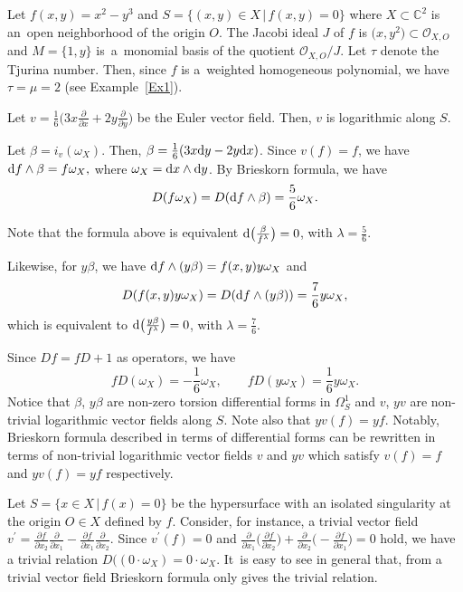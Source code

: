 \documentclass[pdftex]{sigma}%
\numberwithin{equation}{section}
\begin{document}
\begin{Example}
 Let $f(x,y)=x^2-y^3 $ and $ S=\{ (x,y) \in X \,|\, f(x,y)=0 \}$ where $X \subset {\mathbb C}^2$ is an~open neighborhood of the origin $O$. The Jacobi ideal $J$ of $f$ is $\big(x, y^2\big) \subset {\mathcal O}_{X,O}$ and $M=\{1, y\}$ is~a~monomial basis of the quotient
${\mathcal O}_{X,O}/J$. Let $\tau$ denote the Tjurina number. Then, since $f$ is a~weighted homogeneous polynomial, we have $\tau=\mu=2$ (see Example~\ref{Ex1}).

Let $v=\frac{1}{6}\big(3x\frac{\partial}{\partial x}+2y\frac{\partial}{\partial y}\big) $ be the Euler vector field. Then, $v$ is logarithmic along $ S$.

Let $\beta=i_v(\omega_X)$. Then, $ \beta=\frac{1}{6}(3x{\rm d}y-2y{\rm d}x)$.
Since $v(f)=f$, we have $ {\rm d}f\wedge \beta = f\omega_X, $ where $ \omega_X={\rm d}x \wedge {\rm d}y$.
By Brieskorn formula, we have
\begin{gather*}
D(f\omega_X) = D({\rm d}f\wedge \beta) =\dfrac{5}{6}\omega_X.
\end{gather*}

Note that the formula above is equivalent $ {\rm d} \big(\frac{\beta}{f^{\lambda}}\big) =0$, with $\lambda = \frac{5}{6}$.


Likewise, for $ y\beta$, we have $ {\rm d}f\wedge (y\beta) = f(x,y)y\omega_X $ and
\begin{gather*}
D(f(x,y)y\omega_X) = D({\rm d}f\wedge (y\beta)) = \dfrac{7}{6}y\omega_X,
\end{gather*}
which is equivalent to
${\rm d} \big(\frac{y\beta}{f^{\lambda}}\big) =0$, with $\lambda = \frac{7}{6}$.

Since $Df=fD+1$ as operators, we have
\[
fD(\omega_X)=-\dfrac{1}{6}\omega_X, \qquad
fD(y\omega_X)=\dfrac{1}{6}y\omega_X.
\]
Notice that $\beta$, $y\beta$ are non-zero torsion differential forms in $ \Omega_S^{1} $ and $v$, $yv$ are non-trivial logarithmic vector fields along $S$. Note also that $yv(f)=yf$.
Notably, Brieskorn formula described in terms of differential forms can be rewritten in terms of non-trivial logarithmic vector fields $v$ and $yv$ which satisfy $v(f)=f$ and $yv(f)=yf$ respectively.
\end{Example}


Let $S=\{x \in X \,|\, f(x)=0 \}$ be the hypersurface with an isolated singularity at the origin $O \in X$ defined by $f$.
Consider, for instance, a trivial vector field $v^{\prime}=\frac{\partial f}{\partial x_2}\frac{\partial}{\partial x_1}-\frac{\partial f}{\partial x_1}\frac{\partial}{\partial x_2}$. Since $v^{\prime}(f)=0$ and $\frac{\partial}{\partial x_1}\big(\frac{\partial f}{\partial x_2}\big)+\frac{\partial}{\partial x_2}\big({-}\frac{\partial f}{\partial x_1}\big) =0$ hold, we have a trivial relation $ D((0 \cdot \omega_X) = 0 \cdot \omega_X$.
It~is easy to see in general that, from a trivial vector field Brieskorn formula only gives the trivial relation.
\end{document}
